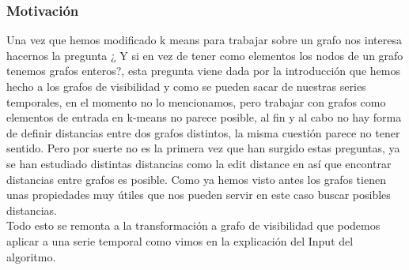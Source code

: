\documentclass[12pt,a4paper]{article}
\begin{document}
			\subsubsection{Motivación}
			Una vez que hemos modificado k means para trabajar sobre un grafo nos interesa hacernos la pregunta ¿ Y si en vez de tener como elementos los nodos de un grafo tenemos grafos enteros?, esta pregunta viene dada por la introducción que hemos hecho a los grafos de visibilidad y como se pueden sacar de nuestras series temporales, en el momento no lo mencionamos, pero trabajar con grafos como elementos de entrada en k-means no parece posible, al fin y al cabo no hay forma de definir distancias entre dos grafos distintos, la misma cuestión parece no tener sentido. Pero por suerte no es la primera vez que han surgido estas preguntas, ya se han estudiado distintas distancias como la edit distance en \cite{DistGrafo} así que encontrar distancias entre grafos es posible. Como ya hemos visto antes los grafos tienen unas propiedades muy útiles que nos pueden servir en este caso buscar posibles distancias.\\
		Todo esto se remonta a la transformación a grafo de visibilidad que podemos aplicar a una serie temporal como vimos en la explicación del Input del algoritmo.	
\end{document}
